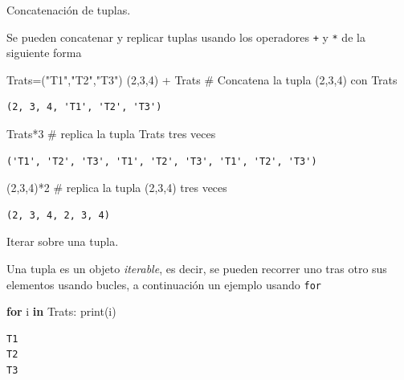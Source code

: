 \documentclass[
  ignorenonframetext,
  aspectratio=169,
  spanish,
]{beamer}
\newenvironment{Shaded}{\begin{snugshade}}{\end{snugshade}}
\newcommand{\BuiltInTok}[1]{\textcolor[rgb]{0.00,0.23,0.31}{#1}}
\newcommand{\CommentTok}[1]{\textcolor[rgb]{0.37,0.37,0.37}{#1}}
\newcommand{\ControlFlowTok}[1]{\textcolor[rgb]{0.00,0.23,0.31}{\textbf{#1}}}
\newcommand{\DecValTok}[1]{\textcolor[rgb]{0.68,0.00,0.00}{#1}}
\newcommand{\KeywordTok}[1]{\textcolor[rgb]{0.00,0.23,0.31}{\textbf{#1}}}
\newcommand{\NormalTok}[1]{\textcolor[rgb]{0.00,0.23,0.31}{#1}}
\newcommand{\OperatorTok}[1]{\textcolor[rgb]{0.37,0.37,0.37}{#1}}
\newcommand{\StringTok}[1]{\textcolor[rgb]{0.13,0.47,0.30}{#1}}
\begin{document}
\begin{frame}[fragile]{Concatenación de tuplas.}
\label{concatenaciuxf3n-de-tuplas.}

Se pueden concatenar y replicar tuplas usando los operadores \texttt{+}
y \texttt{*} de la siguiente forma

\begin{Shaded}
\begin{Highlighting}[]
\NormalTok{Trats}\OperatorTok{=}\NormalTok{(}\StringTok{"T1"}\NormalTok{,}\StringTok{"T2"}\NormalTok{,}\StringTok{"T3"}\NormalTok{) }
\NormalTok{(}\DecValTok{2}\NormalTok{,}\DecValTok{3}\NormalTok{,}\DecValTok{4}\NormalTok{) }\OperatorTok{+}\NormalTok{ Trats }\CommentTok{\# Concatena la tupla (2,3,4) con Trats }
\end{Highlighting}
\end{Shaded}

\begin{verbatim}
(2, 3, 4, 'T1', 'T2', 'T3')
\end{verbatim}

\begin{Shaded}
\begin{Highlighting}[]
\NormalTok{Trats}\OperatorTok{*}\DecValTok{3}         \CommentTok{\# replica la tupla Trats tres veces }
\end{Highlighting}
\end{Shaded}

\begin{verbatim}
('T1', 'T2', 'T3', 'T1', 'T2', 'T3', 'T1', 'T2', 'T3')
\end{verbatim}

\begin{Shaded}
\begin{Highlighting}[]
\NormalTok{(}\DecValTok{2}\NormalTok{,}\DecValTok{3}\NormalTok{,}\DecValTok{4}\NormalTok{)}\OperatorTok{*}\DecValTok{2}       \CommentTok{\# replica la tupla (2,3,4) tres veces }
\end{Highlighting}
\end{Shaded}

\begin{verbatim}
(2, 3, 4, 2, 3, 4)
\end{verbatim}
\end{frame}

\begin{frame}[fragile]{Iterar sobre una tupla.}
\label{iterar-sobre-una-tupla.}

Una tupla es un objeto \emph{iterable}, es decir, se pueden recorrer uno
tras otro sus elementos usando bucles, a continuación un ejemplo usando
\texttt{for}

\begin{Shaded}
\begin{Highlighting}[]
\ControlFlowTok{for}\NormalTok{ i }\KeywordTok{in}\NormalTok{ Trats:}
    \BuiltInTok{print}\NormalTok{(i) }
\end{Highlighting}
\end{Shaded}

\begin{verbatim}
T1
T2
T3
\end{verbatim}
\end{frame}
\end{document}

